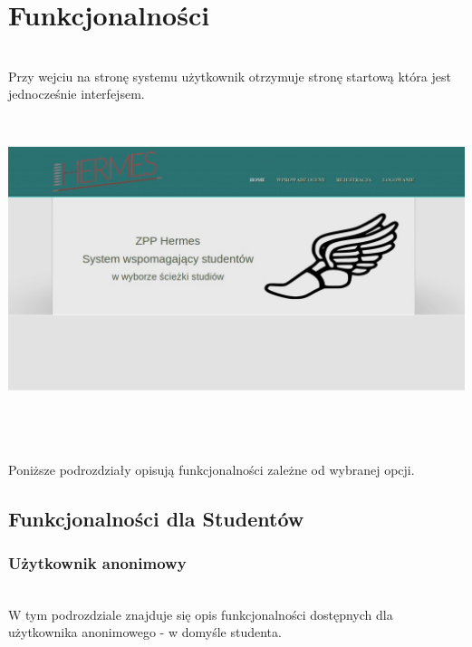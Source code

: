 \documentclass[licencjacka]{pracamgr}
\begin{document}
\chapter{Funkcjonalności}
~\\ \indent
Przy wejciu na stronę systemu użytkownik otrzymuje stronę startową która jest jednocześnie interfejsem. \\ \par
~\\
\begin{minipage}{\linewidth}
	 \centering
           \includegraphics[scale=0.5]{home.jpg}
\end{minipage} \\ \\ \\

 Poniższe podrozdziały opisują funkcjonalności zależne od wybranej opcji.

\section{Funkcjonalności dla Studentów}

\subsection{Użytkownik anonimowy}
~\\ \indent
W tym podrozdziale znajduje się opis funkcjonalności dostępnych dla użytkownika anonimowego - w domyśle studenta.
~\\
\end{document}
